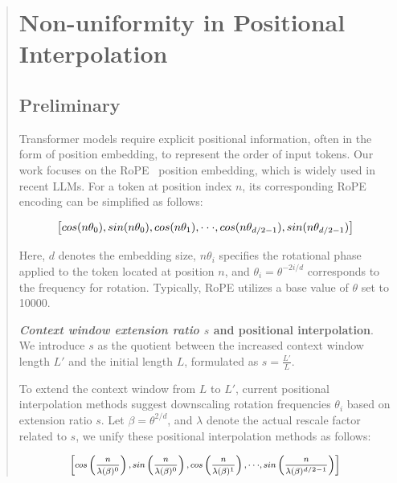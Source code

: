 \begin{abstract}
\section{Non-uniformity in Positional Interpolation}
\label{sec:analysis}

\subsection{Preliminary}

Transformer models require explicit positional information, often in the form of position embedding, to represent the order of input tokens. Our work focuses on the RoPE~\cite{rope} position embedding, which is widely used in recent  LLMs. For a token at position index $n$, its corresponding RoPE encoding can be simplified as follows:

\begin{equation}
		\fontsize{7.8}{7.8} \selectfont
	\label{eq:rope}
	\left[ cos(n\theta_0), sin(n\theta_0), cos(n\theta_1), \cdot\cdot\cdot, cos(n\theta_{d/2-1}), sin(n\theta_{d/2-1}) \right]   
\end{equation}

Here, $d$ denotes the embedding size, $n\theta_i$ specifies the rotational phase applied to the token located at position $n$, and $\theta_i=\theta^{-2i/d}$ corresponds to the frequency for rotation. Typically, RoPE utilizes a base value of $\theta$ set to 10000.

\textbf{\emph{Context window extension ratio $s$} and positional interpolation}. We introduce $s$ as the quotient between the increased context window length $L'$ and the initial length $L$, formulated as $s=\frac{L'}{L}$.

To extend the context window from $L$ to $L'$, current positional interpolation methods suggest downscaling rotation frequencies $\theta_i$ based on extension ratio $s$. Let $\beta=\theta^{2/d}$, and $\lambda$ denote the actual rescale factor related to $s$, we   unify these positional interpolation methods as follows:

\begin{equation}	
	\fontsize{7.5}{7.5} \selectfont
	\label{eq:unified_rope}
	\begin{aligned}
		\left[cos\left(\frac{n}{\lambda(\beta)^0}\right), sin \left(\frac{n}{\lambda(\beta)^0}\right), cos\left(\frac{n}{\lambda(\beta)^1}\right), \cdot\cdot\cdot,  sin \left(\frac{n}{\lambda(\beta)^{d/2-1}}\right) \right]   
	\end{aligned}
\end{equation}


\end{abstract}
